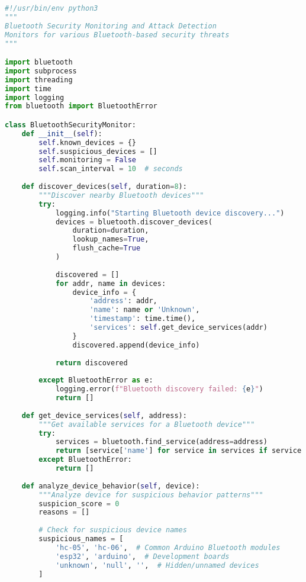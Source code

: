 \documentclass[12pt,a4paper]{report}
\begin{document}
\begin{lstlisting}[language=Python, caption=Bluetooth Attack Detection System]
#!/usr/bin/env python3
"""
Bluetooth Security Monitoring and Attack Detection
Monitors for various Bluetooth-based security threats
"""

import bluetooth
import subprocess
import threading
import time
import logging
from bluetooth import BluetoothError

class BluetoothSecurityMonitor:
    def __init__(self):
        self.known_devices = {}
        self.suspicious_devices = []
        self.monitoring = False
        self.scan_interval = 10  # seconds
        
    def discover_devices(self, duration=8):
        """Discover nearby Bluetooth devices"""
        try:
            logging.info("Starting Bluetooth device discovery...")
            devices = bluetooth.discover_devices(
                duration=duration, 
                lookup_names=True, 
                flush_cache=True
            )
            
            discovered = []
            for addr, name in devices:
                device_info = {
                    'address': addr,
                    'name': name or 'Unknown',
                    'timestamp': time.time(),
                    'services': self.get_device_services(addr)
                }
                discovered.append(device_info)
                
            return discovered
            
        except BluetoothError as e:
            logging.error(f"Bluetooth discovery failed: {e}")
            return []
    
    def get_device_services(self, address):
        """Get available services for a Bluetooth device"""
        try:
            services = bluetooth.find_service(address=address)
            return [service['name'] for service in services if service.get('name')]
        except BluetoothError:
            return []
    
    def analyze_device_behavior(self, device):
        """Analyze device for suspicious behavior patterns"""
        suspicion_score = 0
        reasons = []
        
        # Check for suspicious device names
        suspicious_names = [
            'hc-05', 'hc-06',  # Common Arduino Bluetooth modules
            'esp32', 'arduino',  # Development boards
            'unknown', 'null', '',  # Hidden/unnamed devices
        ]
        

\end{lstlisting}
\end{document}
